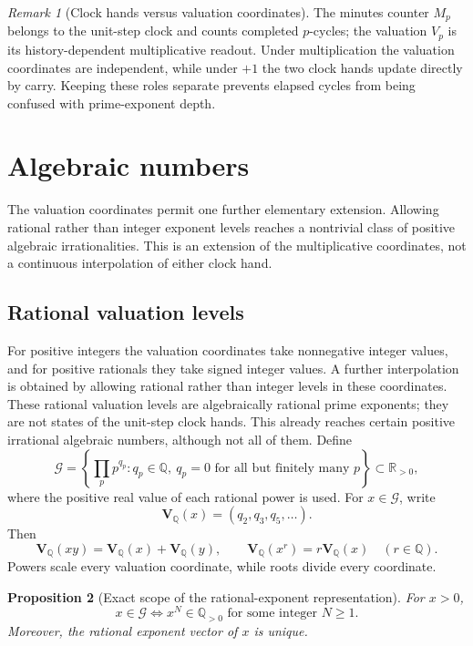 \documentclass[11pt,a4paper]{article}
\theoremstyle{clockplain}
\newtheorem{proposition}{Proposition}
\theoremstyle{definition}
\theoremstyle{remark}
\newtheorem{remark}[proposition]{Remark}
\newcommand{\Q}{\mathbb Q}
\newcommand{\G}{\mathcal G}
\newcommand{\VQ}{\mathbf V_{\!\Q}}
\begin{document}
\begin{remark}[Clock hands versus valuation coordinates]
The minutes counter $M_p$ belongs to the unit-step clock and counts completed $p$-cycles; the valuation $V_p$ is its history-dependent multiplicative readout. Under multiplication the valuation coordinates are independent, while under $+1$ the two clock hands update directly by carry. Keeping these roles separate prevents elapsed cycles from being confused with prime-exponent depth.
\end{remark}

\section{Algebraic numbers}

The valuation coordinates permit one further elementary extension. Allowing rational rather than integer exponent levels reaches a nontrivial class of positive algebraic irrationalities. This is an extension of the multiplicative coordinates, not a continuous interpolation of either clock hand.

\subsection{Rational valuation levels}

For positive integers the valuation coordinates take nonnegative integer values, and for positive rationals they take signed integer values. A further interpolation is obtained by allowing rational rather than integer levels in these coordinates. These rational valuation levels are algebraically rational prime exponents; they are not states of the unit-step clock hands. This already reaches certain positive irrational algebraic numbers, although not all of them. Define
\begin{equation}
\G=
\left\{\prod_p p^{q_p}:q_p\in\Q,\ q_p=0\text{ for all but finitely many }p\right\}
\subset\mathbb R_{>0},
\label{eq:G}
\end{equation}
where the positive real value of each rational power is used. For $x\in\G$, write
\[
\VQ(x)=(q_2,q_3,q_5,\ldots).
\]
Then
\begin{equation}
\VQ(xy)=\VQ(x)+\VQ(y),
\qquad
\VQ(x^r)=r\VQ(x)\quad(r\in\Q).
\label{eq:fractional-linear}
\end{equation}
Powers scale every valuation coordinate, while roots divide every coordinate.

\begin{proposition}[Exact scope of the rational-exponent representation]
\label{prop:Gcharacterization}
For $x>0$,
\begin{equation}
\boxed{x\in\G\iff x^N\in\Q_{>0}\text{ for some integer }N\ge1.}
\label{eq:Gcharacterization}
\end{equation}
Moreover, the rational exponent vector of $x$ is unique.
\end{proposition}
\end{document}
